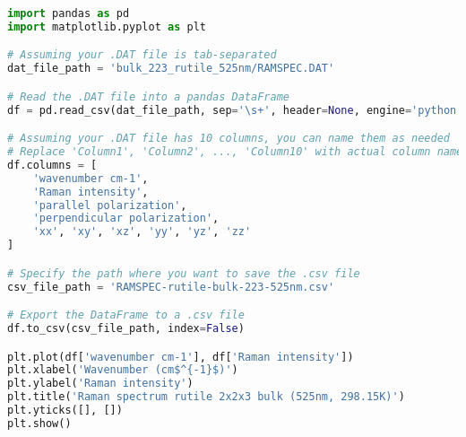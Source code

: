 \documentclass[a4paper,10pt]{article}
\begin{document}
\begin{lstlisting}[language=Python, caption=Python example]
import pandas as pd
import matplotlib.pyplot as plt

# Assuming your .DAT file is tab-separated
dat_file_path = 'bulk_223_rutile_525nm/RAMSPEC.DAT'

# Read the .DAT file into a pandas DataFrame
df = pd.read_csv(dat_file_path, sep='\s+', header=None, engine='python')

# Assuming your .DAT file has 10 columns, you can name them as needed
# Replace 'Column1', 'Column2', ..., 'Column10' with actual column names
df.columns = [
    'wavenumber cm-1',
    'Raman intensity',
    'parallel polarization',
    'perpendicular polarization',
    'xx', 'xy', 'xz', 'yy', 'yz', 'zz'
]

# Specify the path where you want to save the .csv file
csv_file_path = 'RAMSPEC-rutile-bulk-223-525nm.csv'

# Export the DataFrame to a .csv file
df.to_csv(csv_file_path, index=False)

plt.plot(df['wavenumber cm-1'], df['Raman intensity'])
plt.xlabel('Wavenumber (cm$^{-1}$)')
plt.ylabel('Raman intensity')
plt.title('Raman spectrum rutile 2x2x3 bulk (525nm, 298.15K)')
plt.yticks([], [])
plt.show()
\end{lstlisting}


\end{document}
